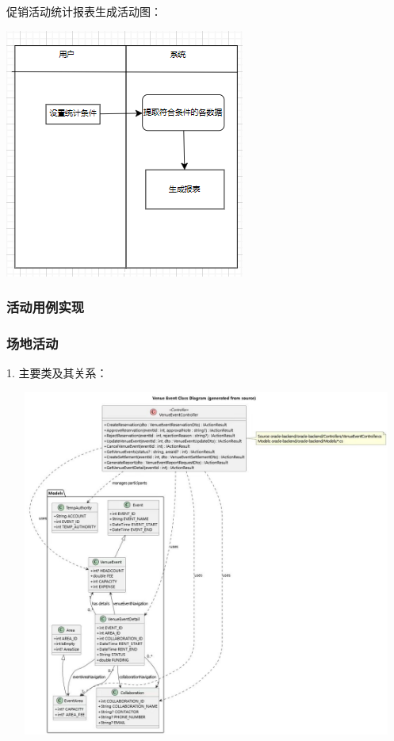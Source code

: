 \documentclass[]{article}
\let\oldincludegraphics\includegraphics
\renewcommand{\includegraphics}[2][]{%
  \begin{center}\oldincludegraphics[#1]{#2}\end{center}%
}
\begin{document}
促销活动统计报表生成活动图：
\includegraphics{media/2.5/image18.png}


\hypertarget{ux6d3bux52a8ux7528ux4f8bux5b9eux73b0}{%
\subsubsection{活动用例实现}\label{ux6d3bux52a8ux7528ux4f8bux5b9eux73b0}}

\subsubsection{场地活动}

1. 主要类及其关系：

\includegraphics[width=6.2in,height=4.5in]{media/2.5/uml1.jpg} %
\end{document}
